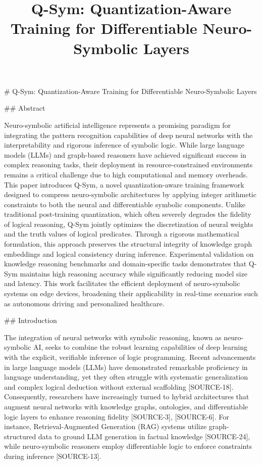 \documentclass{article}
\title{Q-Sym: Quantization-Aware Training for Differentiable Neuro-Symbolic Layers}
\date{}
\begin{document}
\maketitle
\# Q-Sym: Quantization-Aware Training for Differentiable Neuro-Symbolic Layers

\#\# Abstract

Neuro-symbolic artificial intelligence represents a promising paradigm for integrating the pattern recognition capabilities of deep neural networks with the interpretability and rigorous inference of symbolic logic. While large language models (LLMs) and graph-based reasoners have achieved significant success in complex reasoning tasks, their deployment in resource-constrained environments remains a critical challenge due to high computational and memory overheads. This paper introduces Q-Sym, a novel quantization-aware training framework designed to compress neuro-symbolic architectures by applying integer arithmetic constraints to both the neural and differentiable symbolic components. Unlike traditional post-training quantization, which often severely degrades the fidelity of logical reasoning, Q-Sym jointly optimizes the discretization of neural weights and the truth values of logical predicates. Through a rigorous mathematical formulation, this approach preserves the structural integrity of knowledge graph embeddings and logical consistency during inference. Experimental validation on knowledge reasoning benchmarks and domain-specific tasks demonstrates that Q-Sym maintains high reasoning accuracy while significantly reducing model size and latency. This work facilitates the efficient deployment of neuro-symbolic systems on edge devices, broadening their applicability in real-time scenarios such as autonomous driving and personalized healthcare.

\#\# Introduction

The integration of neural networks with symbolic reasoning, known as neuro-symbolic AI, seeks to combine the robust learning capabilities of deep learning with the explicit, verifiable inference of logic programming. Recent advancements in large language models (LLMs) have demonstrated remarkable proficiency in language understanding, yet they often struggle with systematic generalization and complex logical deduction without external scaffolding [SOURCE-18]. Consequently, researchers have increasingly turned to hybrid architectures that augment neural networks with knowledge graphs, ontologies, and differentiable logic layers to enhance reasoning fidelity [SOURCE-3], [SOURCE-6]. For instance, Retrieval-Augmented Generation (RAG) systems utilize graph-structured data to ground LLM generation in factual knowledge [SOURCE-24], while neuro-symbolic reasoners employ differentiable logic to enforce constraints during inference [SOURCE-13].
\end{document}
